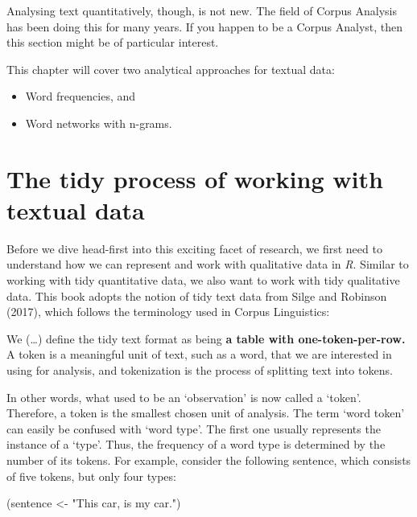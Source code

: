 \documentclass[
  letterpaper,
]{krantz}
\makeatletter
\newenvironment{Shaded}{\begin{snugshade}}{\end{snugshade}}
\newcommand{\NormalTok}[1]{\textcolor[rgb]{0.00,0.23,0.31}{#1}}
\newcommand{\OtherTok}[1]{\textcolor[rgb]{0.00,0.23,0.31}{#1}}
\newcommand{\StringTok}[1]{\textcolor[rgb]{0.13,0.47,0.30}{#1}}
\renewenvironment{quote}{\begin{VF}}{\end{VF}}
\newenvironment{kframe}{%
\medskip{}
\setlength{\fboxsep}{.8em}
 \def\at@end@of@kframe{}%
 \ifinner\ifhmode%
  \def\at@end@of@kframe{\end{minipage}}%
  \begin{minipage}{\columnwidth}%
 \fi\fi%
 \def\FrameCommand##1{\hskip\@totalleftmargin \hskip-\fboxsep
 \colorbox{shadecolor}{##1}\hskip-\fboxsep
     \hskip-\linewidth \hskip-\@totalleftmargin \hskip\columnwidth}%
 \MakeFramed {\advance\hsize-\width
   \@totalleftmargin\z@ \linewidth\hsize
   \@setminipage}}%
 {\par\unskip\endMakeFramed%
 \at@end@of@kframe}
\renewenvironment{Shaded}{\begin{kframe}}{\end{kframe}}
\makeatother
\begin{document}
Analysing text quantitatively, though, is not new. The field of Corpus
Analysis has been doing this for many years. If you happen to be a
Corpus Analyst, then this section might be of particular interest.

This chapter will cover two analytical approaches for textual data:

\begin{itemize}
\item
  Word frequencies, and
\item
  Word networks with n-grams.
\end{itemize}

\section{The tidy process of working with textual
data}\label{sec-tidy-process-for-textual-data}

Before we dive head-first into this exciting facet of research, we first
need to understand how we can represent and work with qualitative data
in \emph{R}. Similar to working with tidy quantitative data, we also
want to work with tidy qualitative data. This book adopts the notion of
tidy text data from Silge and Robinson (2017), which follows the
terminology used in Corpus Linguistics:

\begin{quote}
We (\ldots) define the tidy text format as being \textbf{a table with
one-token-per-row.} A token is a meaningful unit of text, such as a
word, that we are interested in using for analysis, and tokenization is
the process of splitting text into tokens.
\end{quote}

In other words, what used to be an `observation' is now called a
`token'. Therefore, a token is the smallest chosen unit of analysis. The
term `word token' can easily be confused with `word type'. The first one
usually represents the instance of a `type'. Thus, the frequency of a
word type is determined by the number of its tokens. For example,
consider the following sentence, which consists of five tokens, but only
four types:

\begin{Shaded}
\begin{Highlighting}[]
\NormalTok{(sentence }\OtherTok{\textless{}{-}} \StringTok{"This car, is my car."}\NormalTok{)}
\end{Highlighting}
\end{Shaded}
\end{document}
